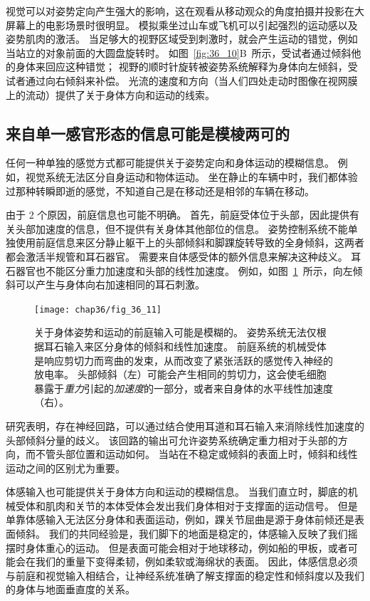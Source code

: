 视觉可以对姿势定向产生强大的影响，这在观看从移动观众的角度拍摄并投影在大屏幕上的电影场景时很明显。
模拟乘坐过山车或飞机可以引起强烈的运动感以及姿势肌肉的激活。
当足够大的视野区域受到刺激时，就会产生运动的错觉，例如当站立的对象前面的大圆盘旋转时。
如图~\ref{fig:36_10}B~所示，受试者通过倾斜他的身体来回应这种错觉；
视野的顺时针旋转被姿势系统解释为身体向左倾斜，受试者通过向右倾斜来补偿。
光流的速度和方向（当人们四处走动时图像在视网膜上的流动）提供了关于身体方向和运动的线索。



\subsection{来自单一感官形态的信息可能是模棱两可的}

任何一种单独的感觉方式都可能提供关于姿势定向和身体运动的模糊信息。
例如，视觉系统无法区分自身运动和物体运动。
坐在静止的车辆中时，我们都体验过那种转瞬即逝的感觉，不知道自己是在移动还是相邻的车辆在移动。


由于 2 个原因，前庭信息也可能不明确。
首先，前庭受体位于头部，因此提供有关头部加速度的信息，但不提供有关身体其他部位的信息。
姿势控制系统不能单独使用前庭信息来区分静止躯干上的头部倾斜和脚踝旋转导致的全身倾斜，这两者都会激活半规管和耳石器官。
需要来自体感受体的额外信息来解决这种歧义。
耳石器官也不能区分重力加速度和头部的线性加速度。 
例如，如图~\ref{fig:36_11}~所示，向左倾斜可以产生与身体向右加速相同的耳石刺激。


\begin{figure}[htbp]
	\centering
	\texttt{[image: chap36/fig\_36\_11]}
	\caption{关于身体姿势和运动的前庭输入可能是模糊的。
		姿势系统无法仅根据耳石输入来区分身体的倾斜和线性加速度。
		前庭系统的机械受体是响应剪切力而弯曲的发束，从而改变了紧张活跃的感觉传入神经的放电率。
		头部倾斜（左）可能会产生相同的剪切力，这会使毛细胞暴露于\textit{重力}引起的\textit{加速度}的一部分，或者来自身体的水平线性加速度（右）。}
	\label{fig:36_11}
\end{figure}


研究表明，存在神经回路，可以通过结合使用耳道和耳石输入来消除线性加速度的头部倾斜分量的歧义。
该回路的输出可允许姿势系统确定重力相对于头部的方向，而不管头部位置和运动如何。
当站在不稳定或倾斜的表面上时，倾斜和线性运动之间的区别尤为重要。


体感输入也可能提供关于身体方向和运动的模糊信息。
当我们直立时，脚底的机械受体和肌肉和关节的本体受体会发出我们身体相对于支撑面的运动信号。
但是单靠体感输入无法区分身体和表面运动，例如，踝关节屈曲是源于身体前倾还是表面倾斜。
我们的共同经验是，我们脚下的地面是稳定的，体感输入反映了我们摇摆时身体重心的运动。
但是表面可能会相对于地球移动，例如船的甲板，或者可能会在我们的重量下变得柔韧，例如柔软或海绵状的表面。
因此，体感信息必须与前庭和视觉输入相结合，让神经系统准确了解支撑面的稳定性和倾斜度以及我们的身体与地面垂直度的关系。



